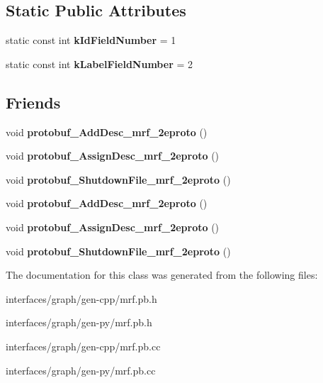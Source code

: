 \subsection*{Static Public Attributes}
\begin{DoxyCompactItemize}
\item 
\hypertarget{classgraph_1_1State_a150e9e7c58dd46aaf1dd05cddf8bbb96}{
static const int {\bfseries kIdFieldNumber} = 1}
\label{classgraph_1_1State_a150e9e7c58dd46aaf1dd05cddf8bbb96}

\item 
\hypertarget{classgraph_1_1State_a47c9ea89be631c1a5135c0b2d89a9ee4}{
static const int {\bfseries kLabelFieldNumber} = 2}
\label{classgraph_1_1State_a47c9ea89be631c1a5135c0b2d89a9ee4}

\end{DoxyCompactItemize}
\subsection*{Friends}
\begin{DoxyCompactItemize}
\item 
\hypertarget{classgraph_1_1State_a7c7daba01236a33140ac99dfb4a21f58}{
void {\bfseries protobuf\_\-AddDesc\_\-mrf\_\-2eproto} ()}
\label{classgraph_1_1State_a7c7daba01236a33140ac99dfb4a21f58}

\item 
\hypertarget{classgraph_1_1State_aef3db81db7837e30d95a050165bc180f}{
void {\bfseries protobuf\_\-AssignDesc\_\-mrf\_\-2eproto} ()}
\label{classgraph_1_1State_aef3db81db7837e30d95a050165bc180f}

\item 
\hypertarget{classgraph_1_1State_a84e801a5b8303ac698fb7040b250e3d1}{
void {\bfseries protobuf\_\-ShutdownFile\_\-mrf\_\-2eproto} ()}
\label{classgraph_1_1State_a84e801a5b8303ac698fb7040b250e3d1}

\item 
\hypertarget{classgraph_1_1State_a7c7daba01236a33140ac99dfb4a21f58}{
void {\bfseries protobuf\_\-AddDesc\_\-mrf\_\-2eproto} ()}
\label{classgraph_1_1State_a7c7daba01236a33140ac99dfb4a21f58}

\item 
\hypertarget{classgraph_1_1State_aef3db81db7837e30d95a050165bc180f}{
void {\bfseries protobuf\_\-AssignDesc\_\-mrf\_\-2eproto} ()}
\label{classgraph_1_1State_aef3db81db7837e30d95a050165bc180f}

\item 
\hypertarget{classgraph_1_1State_a84e801a5b8303ac698fb7040b250e3d1}{
void {\bfseries protobuf\_\-ShutdownFile\_\-mrf\_\-2eproto} ()}
\label{classgraph_1_1State_a84e801a5b8303ac698fb7040b250e3d1}

\end{DoxyCompactItemize}


The documentation for this class was generated from the following files:\begin{DoxyCompactItemize}
\item 
interfaces/graph/gen-\/cpp/mrf.pb.h\item 
interfaces/graph/gen-\/py/mrf.pb.h\item 
interfaces/graph/gen-\/cpp/mrf.pb.cc\item 
interfaces/graph/gen-\/py/mrf.pb.cc\end{DoxyCompactItemize}
